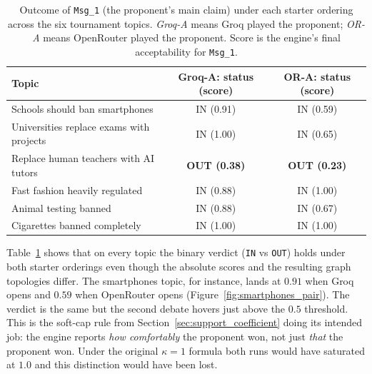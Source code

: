 \begin{table}[ht]
\centering
\caption{Outcome of \texttt{Msg\_1} (the proponent's main claim) under each starter ordering across the six tournament topics. \emph{Groq-A} means Groq played the proponent; \emph{OR-A} means OpenRouter played the proponent. Score is the engine's final acceptability for \texttt{Msg\_1}.}
\label{tab:aivai_outcomes}
\begin{tabular}{lcc}
\toprule
Topic & Groq-A: status (score) & OR-A: status (score) \\
\midrule
Schools should ban smartphones                & IN (0.91) & IN (0.59) \\
Universities replace exams with projects      & IN (1.00) & IN (0.65) \\
Replace human teachers with AI tutors         & \textbf{OUT (0.38)} & \textbf{OUT (0.23)} \\
Fast fashion heavily regulated                & IN (0.88) & IN (1.00) \\
Animal testing banned                         & IN (0.88) & IN (0.67) \\
Cigarettes banned completely                  & IN (1.00) & IN (1.00) \\
\bottomrule
\end{tabular}
\end{table}

Table~\ref{tab:aivai_outcomes} shows that on every topic the binary verdict (\texttt{IN} vs \texttt{OUT}) holds under both starter orderings even though the absolute scores and the resulting graph topologies differ. The smartphones topic, for instance, lands at $0.91$ when Groq opens and $0.59$ when OpenRouter opens (Figure~\ref{fig:smartphones_pair}). The verdict is the same but the second debate hovers just above the $0.5$ threshold. This is the soft-cap rule from Section~\ref{sec:support_coefficient} doing its intended job: the engine reports \emph{how comfortably} the proponent won, not just \emph{that} the proponent won. Under the original $\kappa = 1$ formula both runs would have saturated at $1.0$ and this distinction would have been lost.

